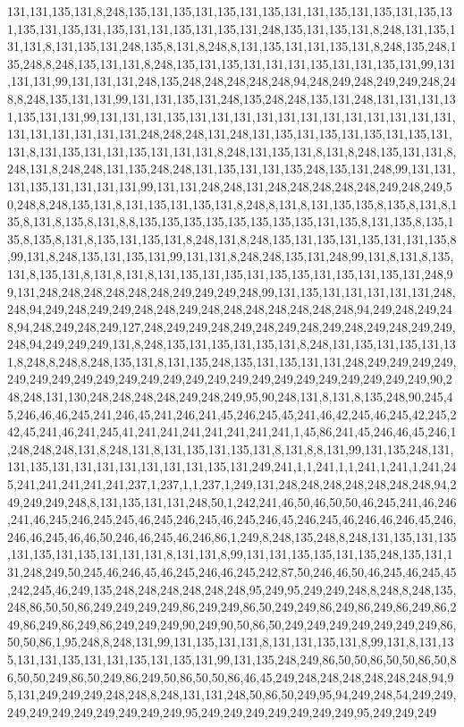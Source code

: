 131,131,135,131,8,248,135,131,135,131,135,131,135,131,131,135,131,135,131,135,131,135,131,135,131,135,131,131,135,131,135,131,248,135,131,135,131,8,248,131,135,131,131,8,131,135,131,248,135,8,131,8,248,8,131,135,131,131,135,131,8,248,135,248,135,248,8,248,135,131,131,8,248,135,131,135,131,131,131,135,131,131,135,131,99,131,131,131,99,131,131,131,248,135,248,248,248,248,248,94,248,249,248,249,249,248,248,8,248,135,131,131,99,131,131,135,131,248,135,248,248,135,131,248,131,131,131,131,135,131,131,99,131,131,131,135,131,131,131,131,131,131,131,131,131,131,131,131,131,131,131,131,131,131,248,248,248,131,248,131,135,131,135,131,135,131,135,131,131,8,131,135,131,131,135,131,131,131,8,248,131,135,131,8,131,8,248,135,131,131,8,248,131,8,248,248,131,135,248,248,131,135,131,131,135,248,135,131,248,99,131,131,131,135,131,131,131,131,99,131,131,248,248,131,248,248,248,248,248,249,248,249,50,248,8,248,135,131,8,131,135,131,135,131,8,248,8,131,8,131,135,135,8,135,8,131,8,135,8,131,8,135,8,131,8,8,135,135,135,135,135,135,135,135,131,135,8,131,135,8,135,135,8,135,8,131,8,135,131,135,131,8,248,131,8,248,135,131,135,131,135,131,131,135,8,99,131,8,248,135,131,135,131,99,131,131,8,248,248,135,131,248,99,131,8,131,8,135,131,8,135,131,8,131,8,131,8,131,135,131,135,131,135,135,131,135,131,135,131,248,99,131,248,248,248,248,248,248,249,249,249,248,99,131,135,131,131,131,131,131,248,248,94,249,248,249,249,248,248,249,248,248,248,248,248,248,248,94,249,248,249,248,94,248,249,248,249,127,248,249,249,248,249,248,249,248,249,248,249,248,249,249,248,94,249,249,249,131,8,248,135,131,135,131,135,131,8,248,131,135,131,135,131,131,8,248,8,248,8,248,135,131,8,131,135,248,135,131,135,131,131,248,249,249,249,249,249,249,249,249,249,249,249,249,249,249,249,249,249,249,249,249,249,249,249,90,248,248,131,130,248,248,248,248,249,248,249,95,90,248,131,8,131,8,135,248,90,245,45,246,46,46,245,241,246,45,241,246,241,45,246,245,45,241,46,42,245,46,245,42,245,242,45,241,46,241,245,41,241,241,241,241,241,241,241,1,45,86,241,45,246,46,45,246,1,248,248,248,131,8,248,131,8,131,135,131,135,131,8,131,8,8,131,99,131,135,248,131,131,135,131,131,131,131,131,131,131,135,131,249,241,1,1,241,1,1,241,1,241,1,241,245,241,241,241,241,241,237,1,237,1,1,237,1,249,131,248,248,248,248,248,248,248,94,249,249,249,248,8,131,135,131,131,248,50,1,242,241,46,50,46,50,50,46,245,241,46,246,241,46,245,246,245,245,46,245,246,245,46,245,246,45,246,245,46,246,46,246,45,246,246,46,245,46,46,50,246,46,245,46,246,86,1,249,8,248,135,248,8,248,131,135,131,135,131,135,131,135,131,131,131,8,131,131,8,99,131,131,135,135,131,135,248,135,131,131,248,249,50,245,46,246,45,46,245,246,46,245,242,87,50,246,46,50,46,245,46,245,45,242,245,46,249,135,248,248,248,248,248,248,95,249,95,249,249,248,8,248,8,248,135,248,86,50,50,86,249,249,249,249,86,249,249,86,50,249,249,86,249,86,249,86,249,86,249,86,249,86,249,86,249,249,249,90,249,90,50,86,50,249,249,249,249,249,249,249,86,50,50,86,1,95,248,8,248,131,99,131,135,131,131,8,131,131,135,131,8,99,131,8,131,135,131,131,135,131,131,135,131,135,131,99,131,135,248,249,86,50,50,86,50,50,86,50,86,50,50,249,86,50,249,86,249,50,86,50,50,86,46,45,249,248,248,248,248,248,248,94,95,131,249,249,249,248,248,8,248,131,131,248,50,86,50,249,95,94,249,248,54,249,249,249,249,249,249,249,249,249,249,95,249,249,249,249,249,249,249,95,249,249,249